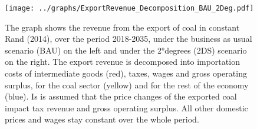 \documentclass[12pt,english]{article}
\begin{document}

\begin{figure}[!b]
	\hspace{-10pt}\texttt{[image: ../graphs/ExportRevenue\_Decomposition\_BAU\_2Deg.pdf]}
	\caption{\label{ExportRevenue_Decomposition_Diff}\small The graph shows the revenue from the export of coal in constant Rand (2014), over the period 2018-2035, under the business as usual scenario (BAU) on the left and under the 2°degrees (2DS) scenario on the right. The export revenue is decomposed into importation costs of intermediate goods (red), taxes, wages and gross operating surplus, for the coal sector (yellow) and for the rest of the economy (blue). Is is assumed that the price changes of the exported coal impact tax revenue and gross operating surplus. All other domestic prices and wages stay constant over the whole period.  }
\end{figure}
\end{document}
